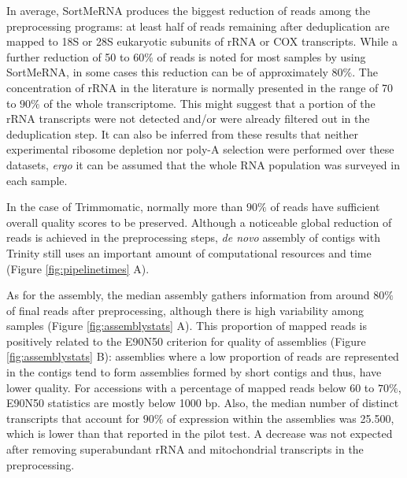 \documentclass[
  openany]{book}
\begin{document}
In average, SortMeRNA produces the biggest reduction of reads among the preprocessing programs: at least half of reads remaining after deduplication are mapped to 18S or 28S eukaryotic subunits of rRNA or COX transcripts. While a further reduction of 50 to \(60\%\) of reads is noted for most samples by using SortMeRNA, in some cases this reduction can be of approximately \(80\%\). The concentration of rRNA in the literature is normally presented in the range of 70 to \(90\%\) of the whole transcriptome. This might suggest that a portion of the rRNA transcripts were not detected and/or were already filtered out in the deduplication step. It can also be inferred from these results that neither experimental ribosome depletion nor poly-A selection were performed over these datasets, \emph{ergo} it can be assumed that the whole RNA population was surveyed in each sample.

In the case of Trimmomatic, normally more than \(90\%\) of reads have sufficient overall quality scores to be preserved. Although a noticeable global reduction of reads is achieved in the preprocessing steps, \emph{de novo} assembly of contigs with Trinity still uses an important amount of computational resources and time (Figure \ref{fig:pipelinetimes} A).

As for the assembly, the median assembly gathers information from around \(80\%\) of final reads after preprocessing, although there is high variability among samples (Figure \ref{fig:assemblystats} A). This proportion of mapped reads is positively related to the E90N50 criterion for quality of assemblies (Figure \ref{fig:assemblystats} B): assemblies where a low proportion of reads are represented in the contigs tend to form assemblies formed by short contigs and thus, have lower quality. For accessions with a percentage of mapped reads below \(60\) to \(70\%\), E90N50 statistics are mostly below 1000 bp. Also, the median number of distinct transcripts that account for \(90\%\) of expression within the assemblies was 25.500, which is lower than that reported in the pilot test. A decrease was not expected after removing superabundant rRNA and mitochondrial transcripts in the preprocessing.
\end{document}
